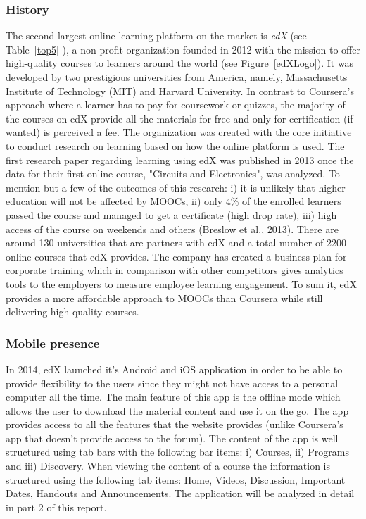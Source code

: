 \documentclass[11]{article}
\begin{document}
\subsubsection{History}
	  The second largest online learning platform on the market is \textit{edX} (see Table~\ref{top5} ), a non-profit organization founded in 2012 with the mission to offer high-quality courses to learners around the world (see Figure~\ref{edXLogo}). It was developed by two prestigious universities from America, namely, Massachusetts Institute of Technology (MIT) and Harvard University. In contrast to Coursera's approach where a learner has to pay for coursework or quizzes, the majority of the courses on edX provide all the materials for free  and only for certification (if wanted) is perceived a fee. The organization was created with the core initiative to conduct research on learning based on how the online platform is used. The first research paper regarding learning using edX was published in 2013 once the data for their first online course, "Circuits and Electronics", was analyzed. To mention but a few of the outcomes of this research: i) it is unlikely that higher education will not be affected by MOOCs, ii) only 4\% of the enrolled learners passed the course and managed to get a certificate (high drop rate), iii) high access of the course on weekends and others (Breslow et al., 2013). There are around 130 universities that are partners with edX and a total number of 2200 online courses that edX provides.  The company has created a business plan for corporate training which in comparison with other competitors  gives analytics tools to the employers to measure employee learning engagement.
	To sum it, edX provides a more affordable approach to MOOCs than Coursera while still delivering high quality courses.\\

\subsubsection{Mobile presence}
\indent
	In 2014, edX launched it's Android and iOS application in order to be able to provide flexibility to the users since they might not have access to a personal computer all the time. The main feature of this app is the offline mode which allows the user to download the material content and use it on the go. The app provides access to all the features that the website provides (unlike Coursera's app that doesn't provide access to the forum). The content of the app is well structured using tab bars with the following bar items: i) Courses, ii) Programs and iii) Discovery. When viewing the content of a course the information is structured using the following tab items: Home, Videos, Discussion, Important Dates, Handouts and Announcements. The application will be analyzed in detail in  part 2 of this report.\\
\end{document}
